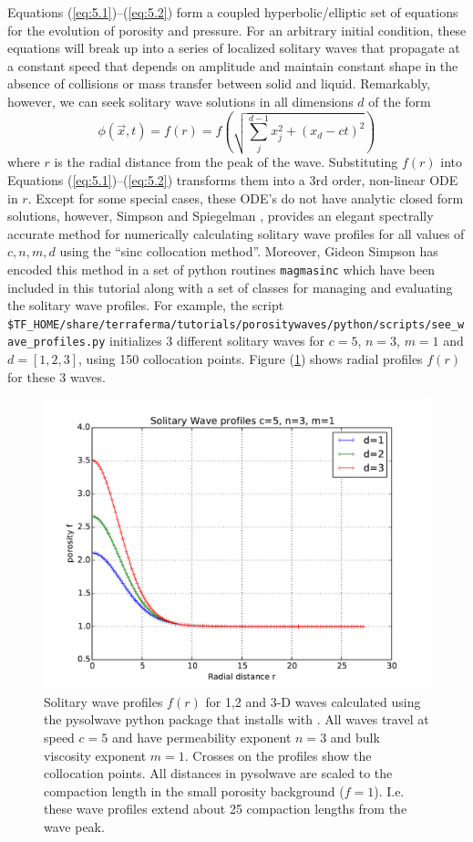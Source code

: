 Equations (\ref{eq:5.1})--(\ref{eq:5.2}) form a coupled
hyperbolic/elliptic set of equations for the evolution of porosity and
pressure.  For an arbitrary initial condition, these equations will
break up into a series of localized solitary waves that propagate at a
constant speed that depends on amplitude and maintain constant shape
in the absence of collisions or mass transfer between solid and
liquid.  Remarkably, however, we can seek solitary wave solutions in
all dimensions $d$ of the form
\begin{equation}
  \label{eq:5.4}
  \phi(\vec{x},t) = f(r) = f
  \left(
    \sqrt{\sum_{j}^{d-1} x_{j}^{2} + (x_{d} -ct)^{2}}
  \right)
\end{equation}
where $r$ is the radial distance from the peak of the wave.
Substituting $f(r)$ into Equations (\ref{eq:5.1})--(\ref{eq:5.2})
transforms them into a 3rd order, non-linear ODE in $r$.  Except for
some special cases,  these ODE's do not have analytic closed form
solutions, however,  Simpson and Spiegelman
\cite{simpson_solitary_2011}, provides an elegant spectrally accurate
method for numerically calculating solitary wave profiles for all
values of $c,n,m,d$ using the ``sinc collocation method''.  Moreover,
Gideon Simpson has encoded this method in a set of python routines
\texttt{magmasinc} which have been included in this tutorial along
with a set of classes for managing and evaluating the solitary wave
profiles.  For example, the script
\texttt{\$TF\_HOME/share/terraferma/tutorials/porositywaves/python/scripts/see\_wave\_profiles.py} initializes 3 different
solitary waves for $c=5$, $n=3$, $m=1$ and $d=[1,2,3]$, using 150
collocation points.  Figure (\ref{fig:SolitaryWaveProfiles}) shows radial profiles $f(r)$ for these
3 waves.  

\begin{figure}[htbp!]
  \centering
  \includegraphics[width=.75\textwidth]{figures/SolitaryWavesProfiles.pdf}
  \caption{Solitary wave profiles $f(r)$ for 1,2 and 3-D waves
    calculated using the pysolwave python package that installs with
    \TF.  All waves travel at speed $c=5$ and have permeability
    exponent $n=3$ and bulk viscosity exponent $m=1$.  Crosses on the
    profiles show the collocation points. All distances in pysolwave
    are scaled to the compaction length in the small porosity
    background ($f=1$).  I.e. these wave profiles extend about 25
    compaction lengths from the wave peak.}
\label{fig:SolitaryWaveProfiles}
 \end{figure}

